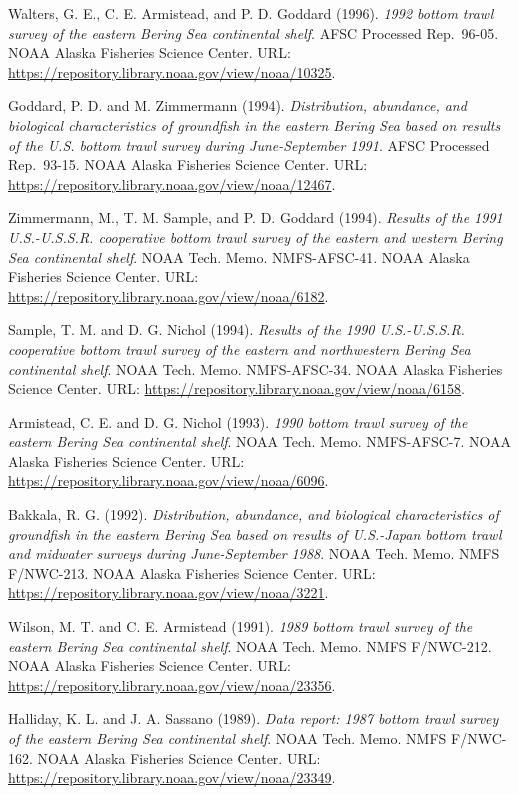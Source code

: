 \documentclass[
  letterpaper,
  oneside,
  open=any]{scrbook}
\begin{document}
Walters, G. E., C. E. Armistead, and P. D. Goddard (1996). \emph{1992
bottom trawl survey of the eastern Bering Sea continental shelf}. AFSC
Processed Rep.~96-05. NOAA Alaska Fisheries Science Center. URL:
\url{https://repository.library.noaa.gov/view/noaa/10325}.

Goddard, P. D. and M. Zimmermann (1994). \emph{Distribution, abundance,
and biological characteristics of groundfish in the eastern Bering Sea
based on results of the U.S. bottom trawl survey during June-September
1991}. AFSC Processed Rep.~93-15. NOAA Alaska Fisheries Science Center.
URL: \url{https://repository.library.noaa.gov/view/noaa/12467}.

Zimmermann, M., T. M. Sample, and P. D. Goddard (1994). \emph{Results of
the 1991 U.S.-U.S.S.R. cooperative bottom trawl survey of the eastern
and western Bering Sea continental shelf}. NOAA Tech. Memo.
NMFS-AFSC-41. NOAA Alaska Fisheries Science Center. URL:
\url{https://repository.library.noaa.gov/view/noaa/6182}.

Sample, T. M. and D. G. Nichol (1994). \emph{Results of the 1990
U.S.-U.S.S.R. cooperative bottom trawl survey of the eastern and
northwestern Bering Sea continental shelf}. NOAA Tech. Memo.
NMFS-AFSC-34. NOAA Alaska Fisheries Science Center. URL:
\url{https://repository.library.noaa.gov/view/noaa/6158}.

Armistead, C. E. and D. G. Nichol (1993). \emph{1990 bottom trawl survey
of the eastern Bering Sea continental shelf}. NOAA Tech. Memo.
NMFS-AFSC-7. NOAA Alaska Fisheries Science Center. URL:
\url{https://repository.library.noaa.gov/view/noaa/6096}.

Bakkala, R. G. (1992). \emph{Distribution, abundance, and biological
characteristics of groundfish in the eastern Bering Sea based on results
of U.S.-Japan bottom trawl and midwater surveys during June-September
1988}. NOAA Tech. Memo. NMFS F/NWC-213. NOAA Alaska Fisheries Science
Center. URL: \url{https://repository.library.noaa.gov/view/noaa/3221}.

Wilson, M. T. and C. E. Armistead (1991). \emph{1989 bottom trawl survey
of the eastern Bering Sea continental shelf}. NOAA Tech. Memo. NMFS
F/NWC-212. NOAA Alaska Fisheries Science Center. URL:
\url{https://repository.library.noaa.gov/view/noaa/23356}.

Halliday, K. L. and J. A. Sassano (1989). \emph{Data report: 1987 bottom
trawl survey of the eastern Bering Sea continental shelf}. NOAA Tech.
Memo. NMFS F/NWC-162. NOAA Alaska Fisheries Science Center. URL:
\url{https://repository.library.noaa.gov/view/noaa/23349}.
\end{document}
